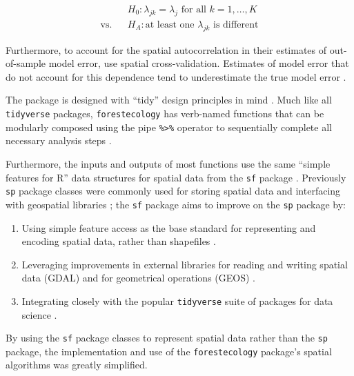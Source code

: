 \documentclass[12pt]{article}
\providecommand{\tightlist}{%
  \setlength{\itemsep}{0pt}\setlength{\parskip}{0pt}}
\begin{document}
\begin{eqnarray}
\label{eq:permutation-hypothesis-test}
&&H_0: \lambda_{jk} = \lambda_{j} \mbox{ for all } k = 1, \ldots, K\\
\text{vs.}&&H_A: \text{at least one } \lambda_{jk} \mbox{ is different} \nonumber
\end{eqnarray}

Furthermore, to account for the spatial autocorrelation in their
estimates of out-of-sample model error, \citet{allen_permutation_2020}
use spatial cross-validation. Estimates of model error that do not
account for this dependence tend to underestimate the true model error
\citep{roberts_cross-validation_2017}.

The package is designed with ``tidy'' design principles in mind
\citep{wickham_welcome_2019}. Much like all \texttt{tidyverse} packages,
\texttt{forestecology} has verb-named functions that can be modularly
composed using the pipe \texttt{\%\textgreater{}\%} operator to
sequentially complete all necessary analysis steps
\citep{bache_pipe_2020}.

Furthermore, the inputs and outputs of most functions use the same
``simple features for R'' data structures for spatial data from the
\texttt{sf} package \citep{pebesma_simple_2018}. Previously \texttt{sp}
package classes were commonly used for storing spatial data and
interfacing with geospatial libraries \citep{bivand_sp_2013}; the
\texttt{sf} package aims to improve on the \texttt{sp} package by:

\begin{enumerate}
\def\labelenumi{\arabic{enumi}.}
\tightlist
\item
  Using simple feature access as the base standard for representing and
  encoding spatial data, rather than shapefiles \citep{herring_2011}.
\item
  Leveraging improvements in external libraries for reading and writing
  spatial data (GDAL) and for geometrical operations (GEOS)
  \citep[\citet{geos_2017}]{warmerdam_geospatial_2008}.
\item
  Integrating closely with the popular \texttt{tidyverse} suite of
  packages for data science \citep{wickham_welcome_2019}.
\end{enumerate}

By using the \texttt{sf} package classes to represent spatial data
rather than the \texttt{sp} package, the implementation and use of the
\texttt{forestecology} package's spatial algorithms was greatly
simplified.
\end{document}
